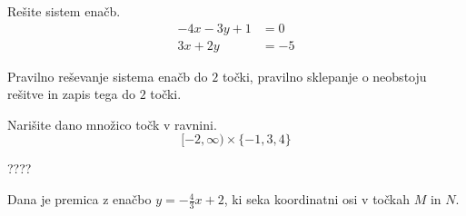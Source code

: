 \documentclass[addpoints,12pt]{exam}
\begin{document}
\begin{questions}
\newpage
    \question[4]
    Rešite sistem enačb.
    $$ \begin{aligned}
        -4x-3y+1&=0 \\ 3x+2y&=-5
    \end{aligned} $$
    
    
    \begin{solution}[11cm]
        Pravilno reševanje sistema enačb do $2$ točki, pravilno sklepanje o neobstoju rešitve in zapis tega do $2$ točki.
    \end{solution}




\newpage
    \question[4]
    Narišite dano množico točk v ravnini.
        $$[-2,\infty)\times \{-1,3,4\}$$

            \begin{solution}[2cm]
                ????
            \end{solution}

\newpage

        


    \question
    Dana je premica z enačbo $y=-\frac{4}{3}x+2$, ki seka koordinatni osi v točkah $M$ in $N$.

\end{questions}
\end{document}
